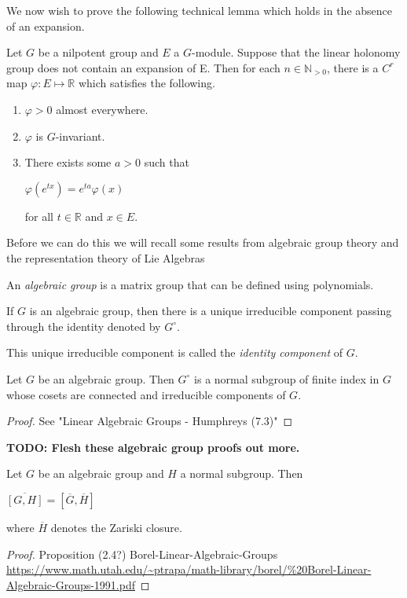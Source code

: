We now wish to prove the following technical lemma which holds in the absence
of an expansion.
\begin{lemma}
    Let $G$ be a nilpotent group and $E$ a $G$-module. Suppose that the linear holonomy group does not
    contain an expansion of E. Then for each $n \in \mathbb{N}_{>0}$, there is a $C^r$ map $\varphi : E \mapsto \mathbb{R}$
    which satisfies the following.
    \begin{enumerate}
        \item $\varphi > 0$ almost everywhere.
        \item $\varphi$ is $G$-invariant.
        \item There exists some $a>0$ such that
              \begin{center}
                  $\varphi(e^{tx}) = e^{ta}\varphi(x)$
              \end{center}
              for all $t \in \mathbb{R}$ and $x \in E$.
    \end{enumerate}
\end{lemma}

Before we can do this we will recall some results from algebraic group theory
and the representation theory of Lie Algebras

\begin{definition}
    An \textit{algebraic group} is a matrix group that can be defined using polynomials.
\end{definition}

If $G$ is an algebraic group, then there is a unique irreducible component
passing through the identity denoted by $G^{\circ}$.

\begin{remark}
    This unique irreducible component is called the \textit{identity component} of $G$.
\end{remark}

\begin{prop}
    Let $G$ be an algebraic group. Then $G^{\circ}$ is a normal subgroup of finite index in $G$ whose cosets are connected and
    irreducible components of $G$. \label{prop:identity-comp}
\end{prop}

\begin{proof}
    See "Linear Algebraic Groups - Humphreys (7.3)"
\end{proof}

\textbf{TODO: Flesh these algebraic group proofs out more.}
\begin{prop}
    Let $G$ be an algebraic group and $H$ a normal subgroup. Then
    \begin{center}
        $\overline{[G, H]} = [\overline{G}, \overline{H}]$
    \end{center}
    where $\overline{H}$ denotes the Zariski closure. \label{prop:zariski-closure}
\end{prop}
\begin{proof}
    Proposition (2.4?) Borel-Linear-Algebraic-Groups \url{https://www.math.utah.edu/~ptrapa/math-library/borel/%20Borel-Linear-Algebraic-Groups-1991.pdf}
\end{proof}

